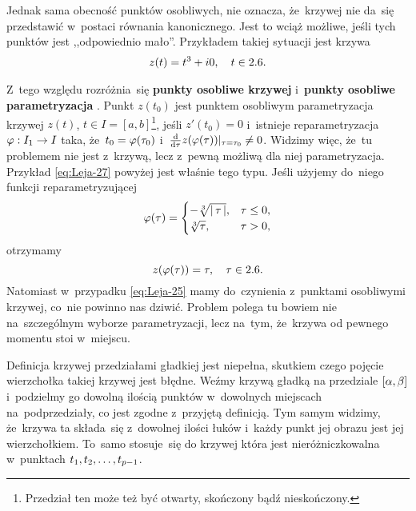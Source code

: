 \documentclass[a4paper,11pt]{article}
\begin{document}
Jednak sama obecność punktów osobliwych, nie oznacza, że~krzywej nie
da~się przedstawić w~postaci równania kanonicznego. Jest to wciąż
możliwe, jeśli tych punktów jest ,,odpowiednio mało''. Przykładem
takiej sytuacji jest krzywa
\begin{equation}
  \label{eq:Leja-30}
  \begin{split}
    z( t ) = t^{ 3 } + i 0, \quad t \in 2.6.
  \end{split}
\end{equation}

Z~tego względu rozróżnia~się \textbf{punkty osobliwe krzywej}
i~\textbf{punkty osobliwe parametryzacja}
\cite{GdowskiElementGeometriiRozniczkowejZZadaniami1999}. Punkt
$z( t_{ 0 } )$ jest punktem osobliwym parametryzacja krzywej $z( t )$,
$t \in I = [ a, b ]$\footnote{Przedział ten może też być otwarty,
  skończony bądź nieskończony.}, jeśli $z'( t_{ 0 } ) = 0$ i~istnieje
reparametryzacja $\varphi: I_{ 1 } \to I$ taka,
że~$t_{ 0 } = \varphi( \tau_{ 0 } )$
i~$\tfrac{ \mathrm{d} }{ \mathrm{d} \tau } z( \varphi( \tau ) )|_{ \tau = \tau_{ 0 } }
\neq 0$. Widzimy więc, że~tu problemem nie jest z~krzywą, lecz z~pewną
możliwą dla niej parametryzacja. Przykład \eqref{eq:Leja-27} powyżej
jest właśnie tego typu. Jeśli użyjemy do~niego funkcji
reparametryzującej
\begin{equation}
  \label{eq:Leja-31}
  \varphi( \tau ) =
  \begin{cases}
    -\sqrt[3]{ \left| \,  \tau  \, \right| }, & \tau \leq 0, \\
    \sqrt[3]{ \tau }, & \tau > 0,
  \end{cases}
\end{equation}
otrzymamy
\begin{equation}
  \label{eq:Leja-32}
  z( \varphi( \tau ) ) = \tau, \quad \tau \in 2.6.
\end{equation}
Natomiast w~przypadku \eqref{eq:Leja-25} mamy do~czynienia z~punktami
osobliwymi krzywej, co~nie powinno nas dziwić. Problem polega tu
bowiem nie na~szczególnym wyborze parametryzacji, lecz na~tym,
że~krzywa od pewnego momentu stoi w~miejscu.

\vspace{\spaceFour}


\start {} Definicja krzywej przedziałami gładkiej jest
niepełna, skutkiem czego pojęcie wierzchołka takiej krzywej jest
błędne. Weźmy krzywą gładką na przedziale $[ \alpha, \beta ]$ i~podzielmy
go dowolną ilością punktów w~dowolnych miejscach na~podprzedziały, co
jest zgodne z~przyjętą definicją. Tym samym widzimy, że~krzywa ta
składa~się z~dowolnej ilości łuków i~każdy punkt jej obrazu jest jej
wierzchołkiem. To~samo stosuje~się do krzywej która jest
nieróżniczkowalna w~punktach $t_{ 1 }, t_{ 2 }, \ldots, t_{ p - 1 }$.
\end{document}
